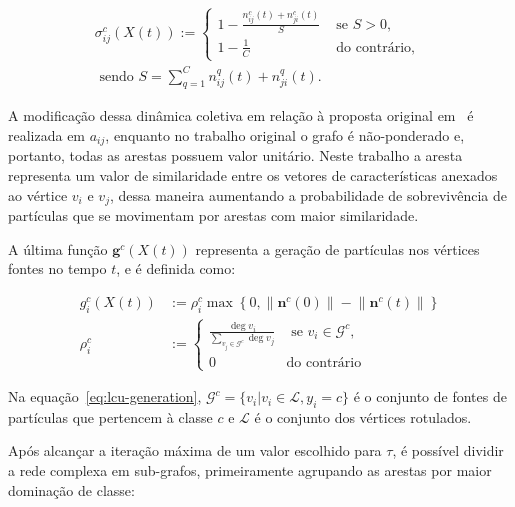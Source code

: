 \begin{equation}\label{eq:lcu-sigma}
\begin{aligned}
\sigma_{i j}^c(X(t)):= \begin{cases}1-\frac{n_{i j}^c(t)+n_{j i}^c(t)}{S} & \text { se } S>0, \\
1-\frac{1}{C} & \text { do contrário, }\end{cases} \\
\text { sendo } S=\sum_{q=1}^C n_{i j}^q(t)+n_{j i}^q(t) .
\end{aligned}
\end{equation}

A modificação dessa dinâmica coletiva em relação à proposta original
em~\cite{VerriNetworkUnfoldingMap2018} é realizada em $a_{ij}$,
enquanto no trabalho original o grafo é não-ponderado e, portanto,
todas as arestas possuem valor unitário. Neste trabalho a aresta representa um
valor de similaridade entre os vetores de características anexados ao
vértice $v_i$ e $v_j$, dessa maneira aumentando a probabilidade de
sobrevivência de partículas que se movimentam por arestas com maior
similaridade.

A última função $\mathbf{g}^c(X(t))$ representa a geração de
partículas nos vértices fontes no tempo $t$, e é definida como:

\begin{equation}\label{eq:lcu-generation}
  \begin{aligned}
    g_i^c(X(t)) &:=\rho_i^c \max \left\{0, \lVert \mathbf{n}^c(0) \rVert - \lVert \mathbf{n}^c(t) \rVert\right\} \\
    \rho_i^c &:= \begin{cases}\frac{\deg v_i}{\sum_{v_j \in \mathcal{G}^c}
      \deg v_j} & \text { se } v_i \in \mathcal{G}^c, \\ 0 & \text {
                                                               do contrário }\end{cases}
  \end{aligned}
\end{equation}

Na equação~\ref{eq:lcu-generation}, $\mathcal{G}^c = \{v_i |v_i \in \mathcal{L}, y_i = c\}$
é o conjunto de fontes de partículas que pertencem à classe $c$ e $\mathcal{L}$
é o conjunto dos vértices rotulados.


Após alcançar a iteração máxima de um valor escolhido para $ \tau $, é possível
dividir a rede complexa em sub-grafos, primeiramente agrupando as
arestas por maior dominação de classe:


